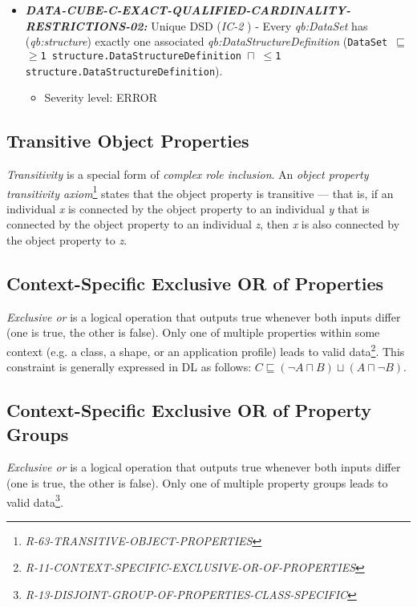 \documentclass{llncs}
\newcommand{\ms}[1]{\texttt{#1}}
\begin{document}
\begin{itemize}
	\item \textbf{{\em DATA-CUBE-C-EXACT-QUALIFIED-CARDINALITY-RESTRICTIONS-02:}}
	Unique DSD (\emph{IC-2} \cite{CyganiakReynolds2014}) -  
	Every \emph{qb:DataSet} has (\emph{qb:structure}) exactly one associated \emph{qb:DataStructureDefinition} (\ms{DataSet $\sqsubseteq$ $\geq$1 structure.DataStructureDefinition $\sqcap$ $\leq$1 structure.DataStructureDefinition}). 
	\begin{itemize}
		\item Severity level: ERROR
	\end{itemize}
\end{itemize}

\subsection{Transitive Object Properties}

\emph{Transitivity} is a special form of \emph{complex role inclusion}.
An \emph{object property transitivity axiom}\footnote{\emph{R-63-TRANSITIVE-OBJECT-PROPERTIES}} states that the object property is transitive — that is, if an individual \emph{x} is connected by the object property to an individual \emph{y} that is connected by the object property to an individual \emph{z}, then \emph{x} is also connected by the object property to \emph{z}.

\subsection{Context-Specific Exclusive OR of Properties}		

\emph{Exclusive or} is a logical operation that outputs true whenever both inputs differ (one is true, the other is false).
Only one of multiple properties within some context (e.g. a class, a shape, or an  application profile) leads to valid data\footnote{\emph{R-11-CONTEXT-SPECIFIC-EXCLUSIVE-OR-OF-PROPERTIES}}.
This constraint is generally expressed in DL as follows: \ms{$C \sqsubseteq (\neg A \sqcap B) \sqcup (A \sqcap \neg B)$}.

\subsection{Context-Specific Exclusive OR of Property Groups}

\emph{Exclusive or} is a logical operation that outputs true whenever both inputs differ (one is true, the other is false).
Only one of multiple property groups leads to valid data\footnote{{\em R-13-DISJOINT-GROUP-OF-PROPERTIES-CLASS-SPECIFIC}}.
\end{document}
